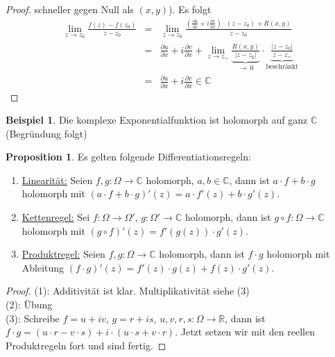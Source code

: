 \documentclass[11pt,titlepage]{article}
\theoremstyle{definition}
\newtheorem{proposition}[theorem]{Proposition}
\newtheorem{example}[theorem]{Beispiel}
\theoremstyle{remark}
\begin{document}
\begin{proof}
		schneller gegen Null als $(x,y)$). Es folgt 
		\begin{eqnarray*}
			\lim_{z\to z_0}\frac{f(z)-f(z_0)}{z-z_0} &=& \lim_{z\to z_0}\frac{\left(\frac{\partial u}{\partial x}
			+i\frac{\partial v}{\partial x}\right)\cdot (z-z_0)+R(x,y)}{z-z_0} \\
			&=&\frac{\partial u}{\partial x}+i\frac{\partial v}{\partial x} +\lim_{z\to z_=}
			\underbrace{\frac{R(x,y)}{|z-z_0|}}_{\to\  0}\cdot \underbrace{\frac{|z-z_0|}{z-z_=}}_{\text{
			beschränkt}}\\
			&=& \frac{\partial u}{\partial x}+i\frac{\partial v}{\partial x} \in\mathbb{C}
		\end{eqnarray*}
	\end{proof}
	
	\begin{example}
		Die komplexe Exponentialfunktion ist holomorph auf ganz $\mathbb{C}$ (Begründung folgt)
	\end{example}
	
	\begin{proposition}\label{prop:Rechenregeln}
		Es gelten folgende Differentiationsregeln:
		\begin{enumerate}
			\item \underline{Linearität:} Seien $f,g:\Omega\to\mathbb{C}$ holomorph, $a,b\in\mathbb{C}
			$, dann ist $a\cdot f+b\cdot g$ holomorph mit $(a\cdot f+b\cdot g)'(z)=a\cdot f'(z)+b\cdot 
			g'(z)$.
			\item \underline{Kettenregel:} Sei $f:\Omega\to\Omega'$, $g:\Omega'\to\mathbb{C}$ 
			holomorph, dann ist $g\circ f:\Omega\to\mathbb{C}$ holomorph mit 
			$(g\circ f)'(z)=f'(g(z))\cdot g'(z)$.
			\item \underline{Produktregel:} Seien $f,g:\Omega\to\mathbb{C}$ holomorph, dann ist 
			$f\cdot g$ holomorph mit Ableitung $(f\cdot g)'(z)= f'(z)\cdot g(z)+f(z)\cdot g'(z)$.
		\end{enumerate}
	\end{proposition}
	
	\begin{proof}
		(1): Additivität ist klar. Multiplikativität siehe (3) \\
		(2): Übung\\
		(3): Schreibe $f=u+iv$, $g=r+is$, $u,v,r,s:\Omega\to\mathbb{R}$, dann ist 
		$f\cdot g=(u\cdot r-v\cdot s)+i\cdot(u\cdot s+v\cdot r)$. Jetzt setzen wir mit den reellen 
		Produktregeln fort und sind fertig.
	\end{proof}
	
\end{document}
